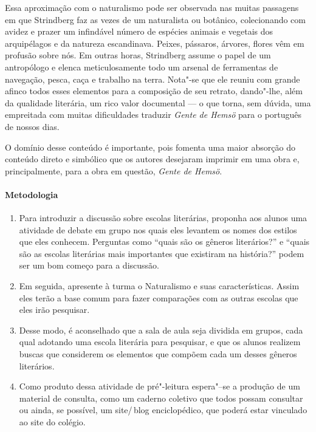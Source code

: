 \documentclass[12pt]{extarticle}
\begin{document}
Essa aproximação com o naturalismo pode ser observada nas muitas passagens 
em que Strindberg faz as vezes de um naturalista ou botânico, colecionando 
com avidez e prazer um infindável número de espécies animais e vegetais 
dos arquipélagos e da natureza escandinava. Peixes, pássaros, árvores,
flores vêm em profusão sobre nós. Em outras horas, Strindberg assume o 
papel de um antropólogo e elenca meticulosamente todo um arsenal de
ferramentas de navegação, pesca, caça e trabalho na terra. Nota"-se que
ele reuniu com grande afinco todos esses elementos para a composição de
seu retrato, dando"-lhe, além da qualidade literária, um rico valor 
documental --- o que torna, sem dúvida, uma empreitada com muitas 
dificuldades traduzir \textit{Gente de Hemsö} para o português de nossos dias.

O domínio desse conteúdo é importante, pois fomenta uma maior absorção do 
conteúdo direto e simbólico que os autores desejaram imprimir em uma obra 
e, principalmente, para a obra em questão, \textit{Gente de Hemsö}.

\paragraph{Metodologia}

\begin{enumerate}

\item
Para introduzir a discussão sobre escolas literárias, proponha aos alunos
uma atividade de debate em grupo nos quais eles levantem os nomes dos 
estilos que eles conhecem. Perguntas como ``quais são os gêneros literários?'' 
e ``quais são as escolas literárias mais importantes que existiram na 
história?'' podem ser um bom começo para a discussão.

\item
Em seguida, apresente à turma o Naturalismo e suas características. Assim 
eles terão a base comum para fazer comparações com as outras escolas que 
eles irão pesquisar. 

\item
Desse modo, é aconselhado que a sala de aula seja dividida em grupos, cada 
qual adotando uma escola literária para pesquisar, e que os alunos realizem 
buscas que considerem os elementos que compõem cada um desses gêneros 
literários. 

\item
Como produto dessa atividade de pré"-leitura espera"--se a produção de um
material de consulta, como um caderno coletivo que todos possam consultar 
ou ainda, se possível, um site/\,blog enciclopédico, que poderá estar 
vinculado ao site do colégio.

\end{enumerate}
\end{document}
